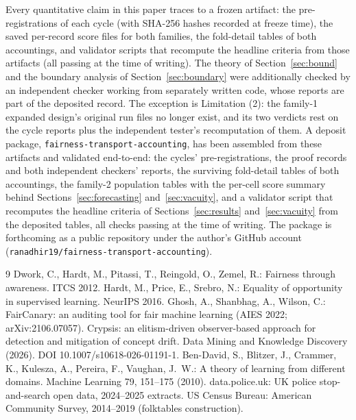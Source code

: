 \documentclass[11pt]{article}
\begin{document}
Every quantitative claim in this paper traces to a frozen artifact:
the pre-registrations of each cycle (with SHA-256 hashes recorded
at freeze time), the saved per-record score files for both
families, the fold-detail tables of both accountings, and
validator scripts that recompute the headline criteria from those
artifacts (all passing at the time of writing). The theory of
Section~\ref{sec:bound} and the boundary analysis of
Section~\ref{sec:boundary} were additionally checked by an
independent checker working from separately written code, whose
reports are part of the deposited record. The exception is
Limitation (2): the family-1 expanded design's original run files
no longer exist, and its two verdicts rest on the cycle reports
plus the independent tester's recomputation of them. A deposit package, \texttt{fairness-transport-accounting},
has been assembled from these artifacts and validated
end-to-end: the cycles' pre-registrations, the proof records
and both independent checkers' reports, the surviving
fold-detail tables of both accountings, the family-2 population
tables with the per-cell score summary behind
Sections~\ref{sec:forecasting} and~\ref{sec:vacuity}, and a
validator script that recomputes the headline criteria of
Sections~\ref{sec:results} and~\ref{sec:vacuity} from the
deposited tables, all checks passing at the time of writing.
The package is forthcoming as a public repository under the
author's GitHub account
(\texttt{ranadhir19/fairness-transport-accounting}).

\begin{thebibliography}{9}
 Dwork, C., Hardt, M., Pitassi, T., Reingold,
O., Zemel, R.: Fairness through awareness. ITCS 2012.
 Hardt, M., Price, E., Srebro, N.: Equality of
opportunity in supervised learning. NeurIPS 2016.
 Ghosh, A., Shanbhag, A., Wilson, C.:
FairCanary: an auditing tool for fair machine learning (AIES
2022; arXiv:2106.07057).
 Crypsis: an elitism-driven observer-based
approach for detection and mitigation of concept drift. Data
Mining and Knowledge Discovery (2026). DOI
10.1007/s10618-026-01191-1.
 Ben-David, S., Blitzer, J., Crammer, K.,
Kulesza, A., Pereira, F., Vaughan, J.~W.: A theory of learning
from different domains. Machine Learning 79, 151--175 (2010).
 data.police.uk: UK police stop-and-search open
data, 2024--2025 extracts.
 US Census Bureau: American Community Survey,
2014--2019 (folktables construction).
\end{thebibliography}
\end{document}
